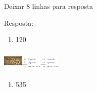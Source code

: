 Deixar 8 linhas para resposta

Resposta:

\begin{enumerate}
\def\labelenumi{\alph{enumi})}
\item
  120
\end{enumerate}

\includegraphics[width=0.37503in,height=0.40003in]{media/image9.png}\includegraphics[width=0.38337in,height=0.31669in]{media/image10.png}\includegraphics[width=0.38337in,height=0.31669in]{media/image10.png}

\begin{enumerate}
\def\labelenumi{\alph{enumi})}
\item
  535
\end{enumerate}

